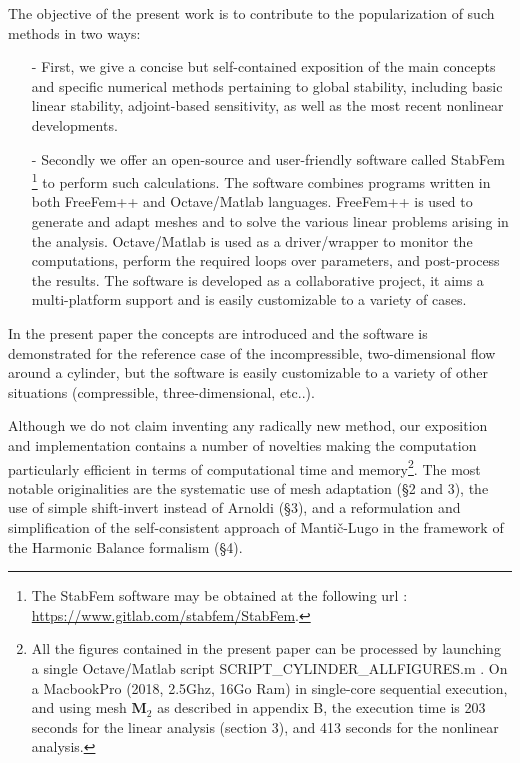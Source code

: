 \documentclass[twocolumn,10pt]{asme2ej}
\begin{document}
The objective of the present work is to contribute to the popularization of such methods 
in two ways:
\begin{itemize}
\item[-]
First, we give a concise but self-contained exposition of the main concepts and 
specific numerical methods pertaining to global stability, including basic linear stability, adjoint-based sensitivity, as well as the most recent nonlinear developments.
\item[-]
Secondly we offer an open-source and user-friendly software called  {\sf StabFem} %
\footnote{The StabFem software may be obtained at the following url : \\
\url{https://www.gitlab.com/stabfem/StabFem}. 
} 
to perform such calculations. The software combines programs written in both FreeFem++ \cite{MR3043640} and Octave/Matlab languages. 
FreeFem++ is used to generate and adapt meshes and to solve the various linear problems arising in the analysis. Octave/Matlab is used as a driver/wrapper to monitor the computations, perform the required loops over parameters, and post-process the results. The software is developed as a collaborative project, it aims a multi-platform support and is easily customizable to a variety of cases. 
\end{itemize}

In the present paper the concepts are introduced and the software is demonstrated for the reference case of the incompressible, two-dimensional flow around a cylinder, but the software is easily customizable to a variety of other situations (compressible, three-dimensional, etc..).

Although we do not claim inventing any radically new method, our exposition and implementation contains a number of novelties making the computation particularly efficient in terms of computational time and memory\footnote{All the figures contained in the present paper can be processed by launching a single Octave/Matlab script {\sf SCRIPT\_CYLINDER\_ALLFIGURES.m} . On a MacbookPro (2018,  2.5Ghz, 16Go Ram) in single-core sequential execution,  and using mesh ${\mathbf M}_2$ as described in appendix B, the execution time is 203 seconds for the linear analysis (section 3), and 413 seconds for the nonlinear analysis.}.
The most notable originalities are the systematic use of mesh adaptation (\S 2 and 3), the use of simple shift-invert instead of Arnoldi (\S 3), and a reformulation and simplification of the self-consistent approach of Manti\v{c}-Lugo in the framework of the Harmonic Balance formalism   (\S 4).
 
\end{document}
